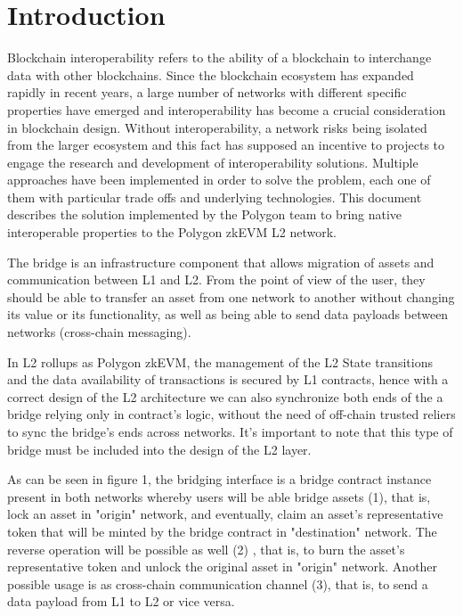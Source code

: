 \section{Introduction}

Blockchain interoperability refers to the ability of a blockchain to interchange data with other blockchains. Since the blockchain ecosystem has expanded rapidly in recent years, a large number of networks with different specific properties have emerged and interoperability has become a crucial consideration in blockchain design. Without interoperability, a network risks being isolated from the larger ecosystem and this fact has supposed an incentive to projects to engage the research and development of interoperability solutions. Multiple approaches have been implemented in order to solve the problem, each one of them with particular trade offs and underlying technologies. This document describes the solution implemented by the Polygon team to bring native interoperable properties to the Polygon zkEVM L2 network.

The bridge is an infrastructure component that allows migration of assets and communication between L1 and L2. From the point of view of the user, they should be able to transfer an asset from one network to another without changing its value or its functionality, as well as being able to send data payloads between networks (cross-chain messaging).

In L2 rollups as Polygon zkEVM, the management of the L2 State transitions and the data availability of transactions is secured by L1 contracts, hence with a correct design of the L2 architecture we can also synchronize both ends of the a bridge relying only in contract's logic, without the need of off-chain trusted reliers to sync the bridge's ends across networks. It's important to note that this type of bridge must be included into the design of the L2 layer.

As can be seen in figure 1, the bridging interface is a bridge contract instance present in both networks whereby users will be able bridge assets (1), that is, lock an asset in "origin" network, and eventually, claim an asset's representative token that will be minted by the bridge contract in "destination" network. The reverse operation will be possible as well (2) , that is, to burn the asset's representative token and unlock the original asset in "origin" network. Another possible usage is as cross-chain communication channel (3), that is, to send a data payload from  L1 to L2 or vice versa.

